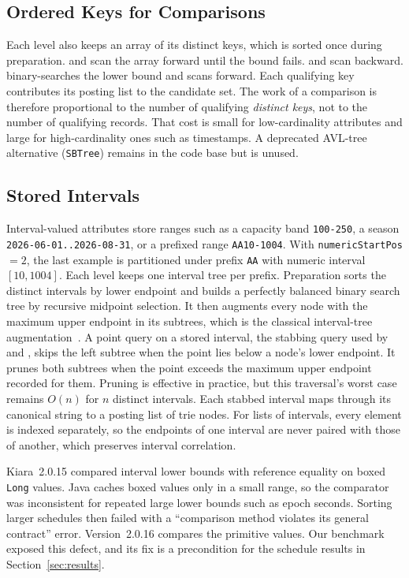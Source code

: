 \subsection{Ordered Keys for Comparisons}
Each level also keeps an array of its distinct keys, which is sorted once during preparation.  and  scan the array forward until the bound fails.  and  scan backward.  binary-searches the lower bound and scans forward. Each qualifying key contributes its posting list to the candidate set. The work of a comparison is therefore proportional to the number of qualifying \emph{distinct keys}, not to the number of qualifying records. That cost is small for low-cardinality attributes and large for high-cardinality ones such as timestamps. A deprecated AVL-tree alternative (\texttt{SBTree}) remains in the code base but is unused.

\subsection{Stored Intervals}
Interval-valued attributes store ranges such as a capacity band \texttt{100-250}, a season \texttt{2026-06-01..2026-08-31}, or a prefixed range \texttt{AA10-1004}. With \texttt{numericStartPos}$=2$, the last example is partitioned under prefix \texttt{AA} with numeric interval $[10,1004]$. Each level keeps one interval tree per prefix. Preparation sorts the distinct intervals by lower endpoint and builds a perfectly balanced binary search tree by recursive midpoint selection. It then augments every node with the maximum upper endpoint in its subtrees, which is the classical interval-tree augmentation~\cite{cormen2009introduction}. A point query on a stored interval, the stabbing query used by  and , skips the left subtree when the point lies below a node's lower endpoint. It prunes both subtrees when the point exceeds the maximum upper endpoint recorded for them. Pruning is effective in practice, but this traversal's worst case remains $O(n)$ for $n$ distinct intervals. Each stabbed interval maps through its canonical string to a posting list of trie nodes. For lists of intervals, every element is indexed separately, so the endpoints of one interval are never paired with those of another, which preserves interval correlation.

Kiara~2.0.15 compared interval lower bounds with reference equality on boxed \texttt{Long} values. Java caches boxed values only in a small range, so the comparator was inconsistent for repeated large lower bounds such as epoch seconds. Sorting larger schedules then failed with a ``comparison method violates its general contract'' error. Version~2.0.16 compares the primitive values. Our benchmark exposed this defect, and its fix is a precondition for the schedule results in Section~\ref{sec:results}.


